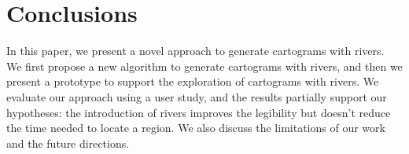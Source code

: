 \section{Conclusions}

In this paper, we present a novel approach to generate cartograms with rivers. We first propose a new algorithm to generate cartograms with rivers, and then we present a prototype to support the exploration of cartograms with rivers. We evaluate our approach using a user study, and the results partially support our hypotheses: the introduction of rivers improves the legibility but doesn't reduce the time needed to locate a region. We also discuss the limitations of our work and the future directions.